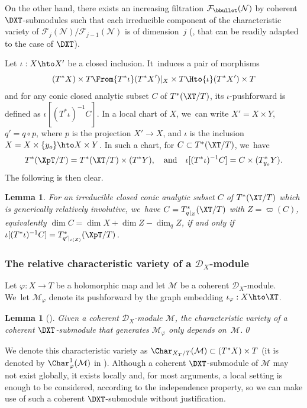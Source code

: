 \documentclass{amsart}
\theoremstyle{plain}
\numberwithin{theorem}{section}
\newtheorem{lemma}[theorem]{Lemma}
\theoremstyle{definition}
\theoremstyle{remark}
\theoremstyle{definition}
\newcommand{\cD}{\mathcal{D}}
\newcommand{\cF}{\mathcal{F}}
\newcommand{\cM}{\mathcal{M}}
\newcommand{\cN}{\mathcal{N}}
\begin{document}
On the other hand, there exists an increasing filtration $\cF_\bbullet(\cN)$ by coherent $\DXT$-submodules such that each irreducible component of the characteristic variety of $\cF_j(\cN)/\cF_{j-1}(\cN)$ is of dimension~$j$ (\cf \cite[\S1.7]{BJ}, that can be readily adapted to the case of $\DXT$).

Let $\iota:X\hto X'$ be a closed inclusion. It~induces a pair of morphisms
\[
(T^*X)\times T\From{T^*\iota}(T^*X')|_X\times T\Hto{\iota}(T^*X')\times T
\]
and for any conic closed analytic subset $C$ of $T^*(\XT/T)$, its $\iota$-pushforward is defined as $\iota[(T^*\iota)^{-1}C]$. In a local chart of $X$, we~can write $X'=X\times Y$, $q'=q\circ p$, where $p$ is the projection $X'\to X$, and $\iota$ is the inclusion $X=X\times\{y_o\}\hto X\times Y$. In such a chart, for $C\subset T^*(\XT/T)$, we~have
\[
T^*(\XpT/T)=T^*(\XT/T)\times (T^*Y),\quad\text{and}\quad \iota[(T^*\iota)^{-1}C]=C\times (T^*_{y_o}Y).
\]
The following is then clear.

\begin{lemma}
For an irreducible closed conic analytic subset $C$ of $T^*(\XT/T)$ which is generically relatively involutive, we~have $C=T^*_{q|_Z}(\XT/T)$ with $Z=\varpi(C)$, equivalently $\dim C=\dim X+\dim Z-\dim_qZ$, if and only if $\iota[(T^*\iota)^{-1}C]=T^*_{q'|_{\iota(Z)}}(\XpT/T)$.
\end{lemma}

\subsubsection*{The relative characteristic variety of a $\cD_X$-module}
Let $\varphi:X\to T$ be a holomorphic map and let $\cM$ be a coherent $\cD_X$-module. We~let $\cM_\varphi$ denote its pushforward by the graph embedding $\iota_\varphi:X\hto \XT$.

\begin{lemma}[{\cite[Chap.\,III, Lem.\,1.3.3]{Schpbook}}]\label{lem:independant}
Given a coherent $\cD_X$-module $\cM$, the charac\-teristic variety of a coherent $\DXT$-submodule that generates $\cM_\varphi$ only depends on~$\cM$.\qed
\end{lemma}

We denote this characteristic variety as $\Char_{X_T/T}(\cM)\subset (T^*X)\times T$ (it is denoted by $\Char^1_\varphi(\cM)$ in \cite{Schpbook}). Although a coherent $\DXT$-submodule of $\cM$ may not exist globally, it exists locally and, for most arguments, a local setting is enough to be considered, according to the independence property, so we can make use of such a coherent $\DXT$-submodule without justification.
\end{document}

